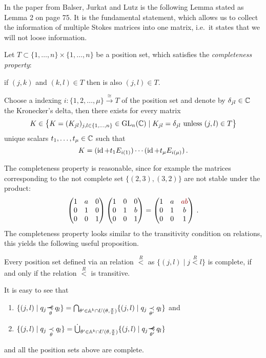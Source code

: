 In the paper \cite{BJL1979Birkhoff} from Balser, Jurkat and Lutz is the
following Lemma stated as Lemma 2 on page 75.  It is the fundamental statement,
which allows us to collect the information of multiple Stokes matrices into one
matrix, i.e.\ it states that we will not loose information.
\begin{lem}\label{lem:UniqueDecompositionWotBlocks}
  Let $T\subset\{1,\dots,n\}\times\{1,\dots,n\}$ be a position set, which
  satisfies the \emph{completeness property}:
  \begin{einr}
    if $(j,k)$ and $(k,l)\in T$ then is also $(j,l)\in T$.
  \end{einr}
  Choose a indexing $i:\{1,2,\dots,\mu \} \overset{\cong}{\to}T$ of the position
  set and denote by $\delta_{jl}\in\mathbb{C}$ the  Kronecker's delta,
  then there exists for every matrix
  \[
    K\in \left\{K=(K_{jl})_{j,l\in\{1,\dots,n\}}\in\operatorname{GL}_n(\mathbb{C})\mid
      K_{jl}=\delta_{jl} \text{~unless~} (j,l)\in T \right\}
  \]
  unique scalars $t_1,\dots,t_\mu\in\mathbb{C}$ such that
  \[
    K=(\operatorname{id} + t_1E_{i(1)})\cdots(\operatorname{id} + t_{\mu}E_{i(\mu)}) \,.
  \]
\end{lem}
The completeness property is reasonable, since for example the matrices
corresponding to the not complete set $\{(2,3),(3,2)\}$ are not stable under the
product:
\begin{align*}
  \begin{pmatrix}
    1 & a & 0
  \\0 & 1 & 0
  \\0 & 0 & 1
  \end{pmatrix}
  \begin{pmatrix}
    1 & 0 & 0
  \\0 & 1 & b
  \\0 & 0 & 1
  \end{pmatrix}
  =
  \begin{pmatrix}
    1 & a & \textcolor{red!60!black}{ab}
  \\0 & 1 & b
  \\0 & 0 & 1
  \end{pmatrix}
  \,.
\end{align*}
The completeness property looks similar to the transitivity condition on
relations, this yields the following useful proposition.
\begin{cor}
  Every position set defined via an relation $\overset{R}{<}$ as
  $\{(j,l)\mid j\overset{R}{<} l\}$ is complete, if and only if the relation
  $\overset{R}{<}$ is transitive.
\end{cor}
\begin{prop}\label{prop:capAndCupOfRels}
  It is easy to see that
  \begin{enumerate}
  \item $\{(j,l) \mid q_j \myrel{\theta} q_l \} =
    \bigcap_{\theta'\in \A^k\cap U(\theta,\frac{\pi}{k})}
    \{(j,l) \mid q_j \underset{\theta'}{\prec} q_l \}$
    and
  \item
    $\{(j,l) \mid q_j \underset{\theta}{\prec} q_l \} =
    \dot\bigcup_{\theta'\in \A^k\cap U(\theta,\frac{\pi}{k})}
    \{(j,l) \mid q_j \myrel{\theta'} q_l \}$
  \end{enumerate}
  and all the position sets above are complete.
\end{prop}

